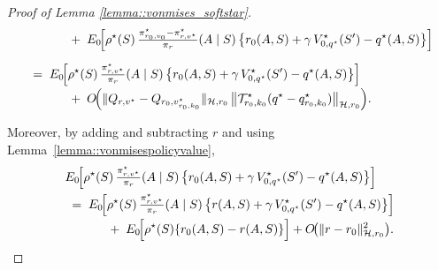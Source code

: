 \documentclass[11pt]{article}
\theoremstyle{plain}
\begin{document}
\begin{proof}[Proof of Lemma \ref{lemma::vonmises_softstar}]
\begin{align*}
&\hspace{1.2cm}
+\;
E_0\!\Big[\rho^\star(S)\,
       \tfrac{\pi_{r_0,v_0}^\star - \pi_{r,v^\star}^\star}{\pi_r}(A \mid S)\,
        \bigl\{
            r_0(A,S)
            + \gamma\,V_{0,q^\star}^\star(S')
            - q^\star(A,S)
        \bigr\}
\Big]
\\[6pt]
&\;=\;
E_0\!\Big[\rho^\star(S)\,
       \tfrac{\pi_{r,v^\star}^\star}{\pi_r}(A \mid S)\,
        \bigl\{
            r_0(A,S)
            + \gamma\,V_{0,q^\star}^\star(S')
            - q^\star(A,S)
        \bigr\}
\Big]
\\[-2pt]
&\hspace{1.2cm}
+\;
O\!\Big(
    \|Q_{r,v^\star} - Q_{r_0,v_{r_0,k_0}^\star}\|_{\mathcal{H},r_0}\,
    \bigl\|
        \mathcal{T}_{r_0,k_0}^\star(q^\star - q_{r_0,k_0}^\star)
    \bigr\|_{\mathcal{H},r_0}
\Big).
\end{align*}

Moreover, by adding and subtracting $r$ and using Lemma~\ref{lemma::vonmisespolicyvalue},
\begin{align*}
& E_0\!\Big[\rho^\star(S)\,
       \tfrac{\pi_{r,v^\star}^\star}{\pi_r}(A \mid S)\,
        \bigl\{
            r_0(A,S)
            + \gamma\,V_{0,q^\star}^\star(S')
            - q^\star(A,S)
        \bigr\}
\Big]
\\
&\;=\;
E_0\!\Big[\rho^\star(S)\,
       \tfrac{\pi_{r,v^\star}^\star}{\pi_r}(A \mid S)\,
        \bigl\{
            r(A,S)
            + \gamma\,V_{0,q^\star}^\star(S')
            - q^\star(A,S)
        \bigr\}
\Big]
\\[-2pt]
&\hspace{1.2cm}
+\;
E_0\!\Big[\rho^\star(S)\{r_0(A,S) - r(A,S)\}\Big]
+
O\!\bigl(\|r - r_0\|_{\mathcal{H},r_0}^2\bigr).
\end{align*}


\end{proof}
\end{document}
